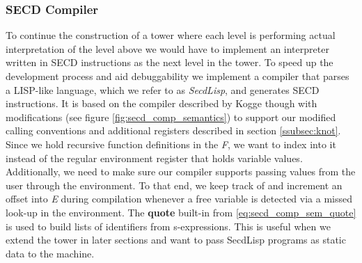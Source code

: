\documentclass[a4paper,12pt,twoside,openright]{report}
\theoremstyle{definition}
\newcommand{\secdlisp}{SecdLisp}
\begin{document}
\subsubsection{SECD Compiler}\label{subsec:secd_comp}
To continue the construction of a tower where each level is performing actual interpretation of the level above we would have to implement an interpreter written in SECD instructions as the next level in the tower. To speed up the development process and aid debuggability we implement a compiler that parses a LISP-like language, which we refer to as \textit{\secdlisp{}}, and generates SECD instructions. It is based on the compiler described by Kogge \cite{kogge1990architecture} though with modifications (see figure \ref{fig:secd_comp_semantics}) to support our modified calling conventions and additional registers described in section \ref{ssubsec:knot}. Since we hold recursive function definitions in the \textit{F}, we want to index into it instead of the regular environment register that holds variable values. Additionally, we need to make sure our compiler supports passing values from the user through the environment. To that end, we keep track of and increment an offset into \textit{E} during compilation whenever a free variable is detected via a missed look-up in the environment. The \textbf{quote} built-in from \eqref{eq:secd_comp_sem_quote} is used to build lists of identifiers from s-expressions. This is useful when we extend the tower in later sections and want to pass \secdlisp{} programs as static data to the machine.
\end{document}
